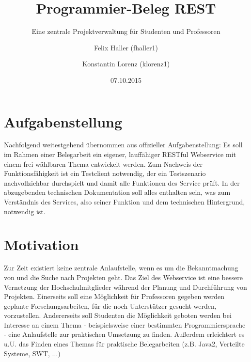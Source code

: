 \documentclass[12pt]{scrartcl}
\begin{document}
	
	
	\subject{Verteilte Systeme}
	\title{Programmier-Beleg REST}
	\subtitle{Eine zentrale Projektverwaltung für Studenten und Professoren}
	\author{Felix Haller (fhaller1) \and Konstantin Lorenz (klorenz1)}
	\date{07.10.2015}
	\publishers{Prüfer: Prof. Dr.-Ing. Andreas Ittner}
	\maketitle
	\thispagestyle{empty} 
	\newpage
	\tableofcontents
	\thispagestyle{empty}
	\newpage	
	\setcounter{page}{1} 
	
	
	
	\section{Aufgabenstellung}
		Nachfolgend weitestgehend übernommen aus offizieller Aufgabenstellung:
		Es soll im Rahmen einer Belegarbeit ein eigener, lauffähiger RESTful Webservice mit einem frei wählbaren Thema entwickelt
		werden. Zum Nachweis der Funktionsfähigkeit ist ein Testclient notwendig, der ein Testszenario nachvollziehbar durchspielt und damit alle Funktionen des Service prüft. In der abzugebenden technischen Dokumentation soll alles enthalten sein, was zum Verständnis des Services, also seiner Funktion und dem technischen Hintergrund, notwendig ist.
		
	\section{Motivation}
		Zur Zeit existiert keine zentrale Anlaufstelle, wenn es um die Bekanntmachung von und die Suche nach Projekten geht. Das Ziel des Webservice ist eine bessere Vernetzung der Hochschulmitglieder während der Planung und Durchführung von Projekten. Einerseits soll eine Möglichkeit für Professoren gegeben werden geplante Forschungsarbeiten, für die noch Unterstützer gesucht werden, vorzustellen. Andererseits soll Studenten die Möglichkeit geboten werden bei Interesse an einem Thema - beispielsweise einer bestimmten Programmiersprache - eine Anlaufstelle zur praktischen Umsetzung zu finden. Außerdem erleichtert es u.U. das Finden eines Themas für praktische Belegarbeiten (z.B. Java2, Verteilte Systeme, SWT, ...)
\end{document}
